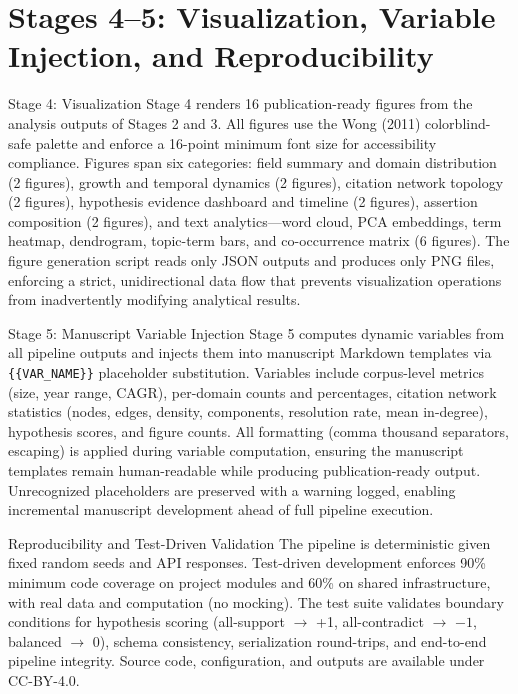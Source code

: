 \documentclass[
  ignorenonframetext,
]{beamer}
\author{\texorpdfstring{}{}}
\date{}
\begin{document}
\section{\texorpdfstring{Stages 4--5: Visualization, Variable Injection,
and Reproducibility
\label{sec:methods_viz}}{Stages 4--5: Visualization, Variable Injection, and Reproducibility }}\label{stages-45-visualization-variable-injection-and-reproducibility}

\begin{frame}{Stage 4: Visualization}
\protect{}\label{stage-4-visualization}
Stage 4 renders 16 publication-ready figures from the analysis outputs
of Stages 2 and 3. All figures use the Wong (2011) colorblind-safe
palette \citep{wong2011colorblind} and enforce a 16-point minimum font
size for accessibility compliance. Figures span six categories: field
summary and domain distribution (2 figures), growth and temporal
dynamics (2 figures), citation network topology (2 figures), hypothesis
evidence dashboard and timeline (2 figures), assertion composition (2
figures), and text analytics---word cloud, PCA embeddings, term heatmap,
dendrogram, topic-term bars, and co-occurrence matrix (6 figures). The
figure generation script reads only JSON outputs and produces only PNG
files, enforcing a strict, unidirectional data flow that prevents
visualization operations from inadvertently modifying analytical
results.
\end{frame}

\begin{frame}[fragile]{Stage 5: Manuscript Variable Injection}
\protect{}\label{stage-5-manuscript-variable-injection}
Stage 5 computes dynamic variables from all pipeline outputs and injects
them into manuscript Markdown templates via \texttt{\{\{VAR\_NAME\}\}}
placeholder substitution. Variables include corpus-level metrics (size,
year range, CAGR), per-domain counts and percentages, citation network
statistics (nodes, edges, density, components, resolution rate, mean
in-degree), hypothesis scores, and figure counts. All formatting (comma
thousand separators, escaping) is applied during variable computation,
ensuring the manuscript templates remain human-readable while producing
publication-ready output. Unrecognized placeholders are preserved with a
warning logged, enabling incremental manuscript development ahead of
full pipeline execution.
\end{frame}

\begin{frame}{Reproducibility and Test-Driven Validation}
\protect{}\label{reproducibility-and-test-driven-validation}
The pipeline is deterministic given fixed random seeds and API
responses. Test-driven development enforces 90\% minimum code coverage
on project modules and 60\% on shared infrastructure, with real data and
computation (no mocking). The test suite validates boundary conditions
for hypothesis scoring (all-support \(\to\) +1, all-contradict \(\to\)
\(-1\), balanced \(\to\) 0), schema consistency, serialization
round-trips, and end-to-end pipeline integrity. Source code,
configuration, and outputs are available under CC-BY-4.0.
\end{frame}
\end{document}
